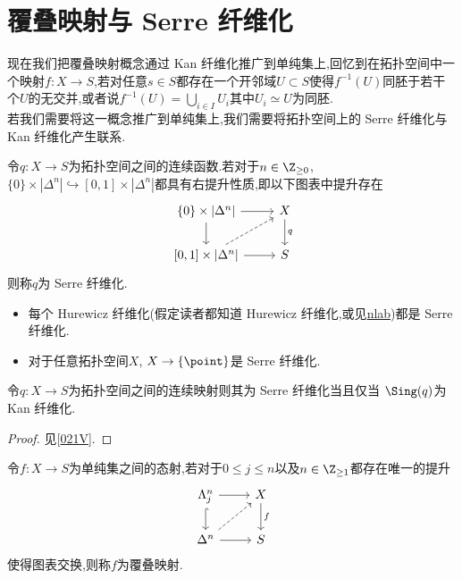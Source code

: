 \section{覆叠映射与 Serre 纤维化}
现在我们把覆叠映射概念通过 Kan 纤维化推广到单纯集上,回忆到在拓扑空间中一个映射$f : X\to S$,若对任意$s\in S$都存在一个开邻域$U \subset S$使得$f^{-1}(U)$同胚于若干个$U$的无交并,或者说$f^{-1}(U) = \bigcup_{i\in I}U_i$其中$U_i \simeq U$为同胚.\\
若我们需要将这一概念推广到单纯集上,我们需要将拓扑空间上的 Serre 纤维化与 Kan 纤维化产生联系.
\begin{definition}
    令$q: X \to S$为拓扑空间之间的连续函数.若对于$n \in \Z_{\geq 0}$, $\{0\}\times |\Delta^n| \hookrightarrow [0,1]\times |\Delta^n|$都具有右提升性质,即以下图表中提升存在
    \[\begin{tikzcd}
	{\{0\}\times |\Delta^n|} & X \\
	{[0,1]\times |\Delta^n|} & S
	\arrow[from=1-1, to=1-2]
	\arrow[from=1-1, to=2-1]
	\arrow["q", from=1-2, to=2-2]
	\arrow[dashed, from=2-1, to=1-2]
	\arrow[from=2-1, to=2-2]
    \end{tikzcd}\]
    则称$q$为 Serre 纤维化.
\end{definition}
\begin{example}
    \begin{itemize}
        \item 每个 Hurewicz 纤维化(假定读者都知道 Hurewicz 纤维化,或见\href{https://ncatlab.org/nlab/show/Hurewicz+fibration}{nlab})都是 Serre 纤维化.
        \item 对于任意拓扑空间$X$, $X \to \{\point\}$是 Serre 纤维化.
    \end{itemize}
\end{example}
\begin{proposition}
    令$q: X \to S$为拓扑空间之间的连续映射则其为 Serre 纤维化当且仅当 $\Sing(q)$为 Kan 纤维化.
\end{proposition}
\begin{proof}
    见\cite{Kerodon}[\href{https://kerodon.net/tag/021V}{021V}].
\end{proof}
\begin{definition}
    令$f:X \to S$为单纯集之间的态射,若对于$0\leq j \leq n$以及$n\in \Z_{\geq 1}$都存在唯一的提升
    \[\begin{tikzcd}
        {\Lambda_j^n} & X \\
	{\Delta^n} & S
	\arrow[from=1-1, to=1-2]
   \arrow[hook, from=1-1, to=2-1]
	\arrow["f", from=1-2, to=2-2]
	\arrow[dashed, from=2-1, to=1-2]
	\arrow[from=2-1, to=2-2]
    \end{tikzcd}\]
    使得图表交换,则称$f$为覆叠映射.
\end{definition}

